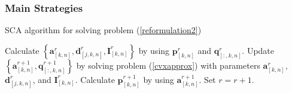 \documentclass[11.5pt]{beamer}
\begin{document}
\begin{frame}
\frametitle{Main Strategies}

\begin{algorithm}[H]
	\caption{SCA algorithm for solving problem (\ref{reformulation2})}
	\label{alg:1}
	\scriptsize
	\begin{algorithmic}[1]
		\Repeat 
		\State Calculate $\left\{\boldsymbol{a}^r_{[k,n]},\boldsymbol{d}^r_{[j,k,n]},\boldsymbol{I}^r_{[k,n]}\right\}$ by using $\boldsymbol{p}^r_{[k,n]}$ and $\boldsymbol{q}^r_{[:,k,n]}$.
		\State Update $\left\{\boldsymbol{a}^{r+1}_{[k,n]},\boldsymbol{q}^{r+1}_{[:,k,n]}\right\}$ by solving problem (\ref{cvxapprox}) with parameters $\boldsymbol{a}^r_{[k,n]}$, $\boldsymbol{d}^r_{[j,k,n]}$, and $\boldsymbol{I}^r_{[k,n]}$.
		\State Calculate $\boldsymbol{p}^{r+1}_{[k,n]}$ by using $\boldsymbol{a}^{r+1}_{[k,n]}$.
		\State Set $r=r+1$.
		 \\
	\end{algorithmic}
\end{algorithm}

\end{frame}
\end{document}

